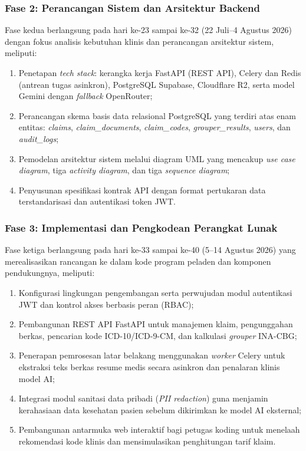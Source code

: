 \subsubsection{Fase 2: Perancangan Sistem dan Arsitektur Backend}
Fase kedua berlangsung pada hari ke-23 sampai ke-32 (22 Juli--4 Agustus 2026) dengan fokus analisis kebutuhan klinis dan perancangan arsitektur sistem, meliputi:
\begin{enumerate}
  \item Penetapan \textit{tech stack}: kerangka kerja FastAPI (REST API), Celery dan Redis (antrean tugas asinkron), PostgreSQL Supabase, Cloudflare R2, serta model Gemini dengan \textit{fallback} OpenRouter;
  \item Perancangan skema basis data relasional PostgreSQL yang terdiri atas enam entitas: \textit{claims}, \textit{claim\_documents}, \textit{claim\_codes}, \textit{grouper\_results}, \textit{users}, dan \textit{audit\_logs};
  \item Pemodelan arsitektur sistem melalui diagram UML yang mencakup \textit{use case diagram}, tiga \textit{activity diagram}, dan tiga \textit{sequence diagram};
  \item Penyusunan spesifikasi kontrak API dengan format pertukaran data terstandarisasi dan autentikasi token JWT.
\end{enumerate}

\subsubsection{Fase 3: Implementasi dan Pengkodean Perangkat Lunak}
Fase ketiga berlangsung pada hari ke-33 sampai ke-40 (5--14 Agustus 2026) yang merealisasikan rancangan ke dalam kode program peladen dan komponen pendukungnya, meliputi:
\begin{enumerate}
  \item Konfigurasi lingkungan pengembangan serta perwujudan modul autentikasi JWT dan kontrol akses berbasis peran (RBAC);
  \item Pembangunan REST API FastAPI untuk manajemen klaim, pengunggahan berkas, pencarian kode ICD-10/ICD-9-CM, dan kalkulasi \textit{grouper} INA-CBG;
  \item Penerapan pemrosesan latar belakang menggunakan \textit{worker} Celery untuk ekstraksi teks berkas resume medis secara asinkron dan penalaran klinis model AI;
  \item Integrasi modul sanitasi data pribadi (\textit{PII redaction}) guna menjamin kerahasiaan data kesehatan pasien sebelum dikirimkan ke model AI eksternal;
  \item Pembangunan antarmuka web interaktif bagi petugas koding untuk menelaah rekomendasi kode klinis dan mensimulasikan penghitungan tarif klaim.
\end{enumerate}

